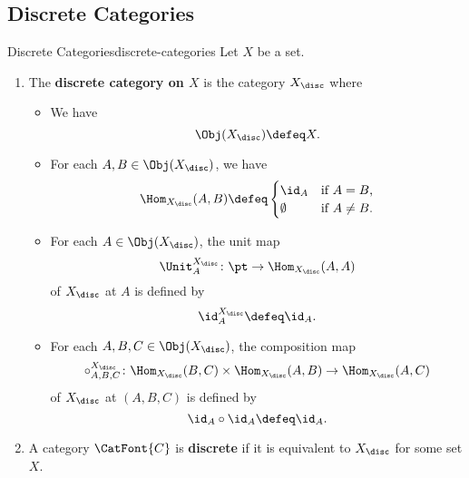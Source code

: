 \subsection{Discrete Categories}\label{subsection-the-quadruple-adjunction-with-sets-discrete-categories}
\begin{definition}{Discrete Categories}{discrete-categories}%
    Let $X$ be a set.
    \begin{enumerate}
        \item\label{discrete-categories-the-discrete-category-on-a-set}The \textbf{discrete category on $X$} is the category $X_{\disc}$ where
            \begin{itemize}
                \item{}We have
                    \[
                        \Obj(X_{\disc})
                        \defeq
                        X.
                    \]%
                \item{}For each $A,B\in\Obj(X_{\disc})$, we have
                    \[
                        \Hom_{X_{\disc}}(A,B)
                        \defeq
                        \begin{cases}
                            \id_{A}   &\text{if $A=B$,}\\
                            \emptyset &\text{if $A\neq B$.}
                        \end{cases}
                    \]
                \item{}For each $A\in\Obj(X_{\disc})$, the unit map
                    \[
                        \Unit^{X_{\disc}}_{A}
                        \colon
                        \pt
                        \to
                        \Hom_{X_{\disc}}(A,A)
                    \]%
                    of $X_{\disc}$ at $A$ is defined by
                    \[
                        \id^{X_{\disc}}_{A}
                        \defeq
                        \id_{A}.
                    \]%
                \item{}For each $A,B,C\in\Obj(X_{\disc})$, the composition map
                    \[
                        \circ^{X_{\disc}}_{A,B,C}
                        \colon
                        \Hom_{X_{\disc}}(B,C)
                        \times
                        \Hom_{X_{\disc}}(A,B)
                        \to
                        \Hom_{X_{\disc}}(A,C)
                    \]%
                    of $X_{\disc}$ at $(A,B,C)$ is defined by
                    \[
                        \id_{A}\circ\id_{A}
                        \defeq
                        \id_{A}.
                    \]%
            \end{itemize}
        \item\label{discrete-categories-discrete-categories}A category $\CatFont{C}$ is \textbf{discrete} if it is equivalent to $X_{\disc}$ for some set $X$.
    \end{enumerate}
\end{definition}

